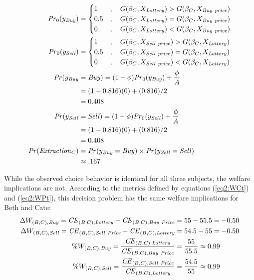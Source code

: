 \documentclass[../main.tex]{subfiles}
\begin{document}
\begin{align}
	\label{eq2:Cate}
	\begin{split}
		{\ensuremath{\mathit{Pr}}}_0(y_{\mathit{Buy}}) &=
		\begin{cases}
			1 &, \quad G(\beta_C,X_{\mathit{Lottery}}) > G(\beta_C,X_{\mathit{Buy\ price}})\\
			0.5 &, \quad G(\beta_C,X_{\mathit{Lottery}}) = G(\beta_C,X_{\mathit{Buy\ price}})\\
			0 &, \quad G(\beta_C,X_{\mathit{Lottery}}) < G(\beta_C,X_{\mathit{Buy\ price}})
		\end{cases} \\
		{\mathit{Pr}}_0(y_{\mathit{Sell}}) &=
		\begin{cases}
			1 &, \quad G(\beta_C,X_{\mathit{Sell\ price}}) > G(\beta_C,X_{\mathit{Lottery}})\\
			0.5 &, \quad G(\beta_C,X_{\mathit{Sell\ price}}) = G(\beta_C,X_{\mathit{Lottery}})\\
			0 &, \quad G(\beta_C,X_{\mathit{Sell\ price}}) < G(\beta_C,X_{\mathit{Lottery}})
		\end{cases}\\
		{\mathit{Pr}}(y_{\mathit{Buy}}&=\mathit{Buy}) = (1-\phi) {\mathit{Pr}}_0(y_{\mathit{Buy}}) + \frac{\phi}{A}\\
		&=(1-0.816)(0) + (0.816)/2\\
		&=0.408\\
		{\mathit{Pr}}(y_{\mathit{Sell}}&=\mathit{Sell}) = (1-\phi) {\mathit{Pr}}_0(y_{\mathit{Sell}}) + \frac{\phi}{A}\\
		&=(1-0.816)(0) + (0.816)/2\\
		&=0.408\\
	{\mathit{Pr}}(\mathit{Extraction}_C) &= {\mathit{Pr}}(y_{\mathit{Buy}} = \mathit{Buy}) \times {\ensuremath{\mathit{Pr}}}(y_{\mathit{Sell}} = \mathit{Sell})\\
	&\approx .167
	\end{split}
\end{align}

While the observed choice behavior is identical for all three subjects, the welfare implications are not.
According to the metrics defined by equations (\ref{eq2:WCt}) and (\ref{eq2:WPt}), this decision problem has the same welfare implications for Beth and Cate:
\begin{align}
	\label{eq2:BCwelfare}
	\begin{split}
		\Delta W_{(B,C),\mathit{Buy}} = {\mathit{CE}}_{(B,C),\mathit{Lottery}} - {\mathit{CE}}_{(B,C),\mathit{Buy\ Price}} &= 55 - 55.5 = -0.50\\
		\Delta W_{(B,C),\mathit{Sell}} = {\mathit{CE}}_{(B,C),\mathit{Sell\ Price}} - {\mathit{CE}}_{(B,C),\mathit{Lottery}} &= 54.5 - 55 = -0.50\\
		\% W_{(B,C),\mathit{Buy}} = \frac{{\mathit{CE}}_{(B,C),\mathit{Lottery}}}{{\mathit{CE}}_{(B,C),\mathit{Buy\ Price}}} &= \frac{55}{55.5} \approx 0.99\\
		\% W_{(B,C),\mathit{Sell}} = \frac{{\mathit{CE}}_{(B,C),\mathit{Sell\ Price}}}{{\mathit{CE}}_{(B,C),\mathit{Lottery}}} &= \frac{54.5}{55} \approx 0.99
	\end{split}
\end{align}
\end{document}
